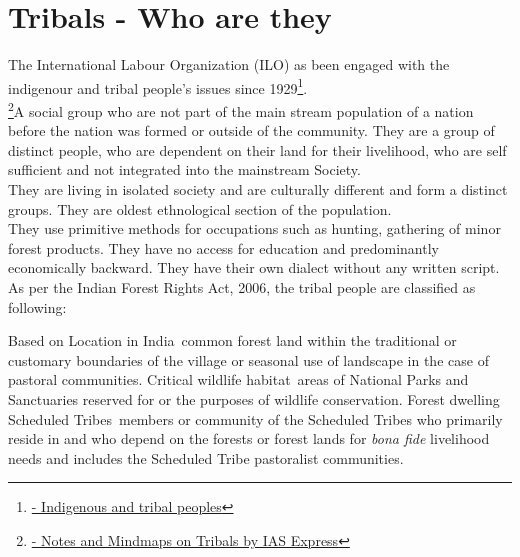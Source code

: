 \documentclass[]{article}
\begin{document}
\section{Tribals - Who are they}
The International Labour Organization (ILO) as been engaged with the indigenour and tribal people's issues since 1929\footnote{\href{https://www.ilo.org/global/topics/indigenous-tribal/lang--en/index.htm}{ - Indigenous and tribal peoples}}.
\vspace{2ex}\\
\footnote{\href{https://www.iasexpress.net/tribal-rights-in-india-constitutional-legal/#&gid=1&pid=1}{ - Notes and Mindmaps on Tribals by IAS Express}}A social group who are not part of the main stream population of a nation before the nation was formed or outside of the community.
They are a group of distinct people, who are dependent on their land for their livelihood, who are self sufficient and not integrated into the mainstream Society.\vspace{2ex}\\   %
\hspace{15pt}They are living in isolated society and are culturally different and form a distinct groups.  They are oldest ethnological section of the population.\vspace{2ex}\\   %
\hspace{15pt}They use primitive methods for occupations such as hunting, gathering of minor forest products.  They have no access for education and predominantly economically backward.  They have their own dialect without any written script.\vspace{3ex}\\   %
\hspace{15pt}
As per the Indian Forest Rights Act, 2006, the tribal people are classified as following:
\begin{tasks}[style=multiline,label-width=20pt]
	\task Based on Location in India\ common forest land within the traditional or customary boundaries of the village or seasonal use of landscape in the case of pastoral communities.
	\task Critical wildlife habitat\ areas of National Parks and Sanctuaries reserved for or the purposes of wildlife conservation.
	\task Forest dwelling Scheduled Tribes\ members or community of the Scheduled Tribes who primarily reside in and who depend on the forests or forest lands for \textit{bona fide} livelihood needs and includes the Scheduled Tribe pastoralist communities.
\end{tasks} 
\end{document}
